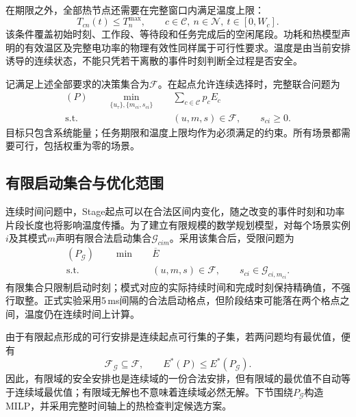 在期限之外，全部热节点还需要在完整窗口内满足温度上限：
\begin{equation}
 T_{cn}(t)\le T_n^{\max},
 \qquad c\in\mathcal C,\ n\in\mathcal N,\ t\in[0,W_c].
 \label{eq:c3-continuous-safe}
\end{equation}
该条件覆盖初始时刻、工作段、等待段和任务完成后的空闲尾段。功耗和热模型声明的有效温区及完整电功率的物理有效性同样属于可行性要求。温度是由当前安排诱导的连续状态，不能只凭若干离散的事件时刻判断全过程是否安全。

记满足上述全部要求的决策集合为$\mathcal F$。在起点允许连续选择时，完整联合问题为
\begin{equation}
 \begin{aligned}
 (P)\qquad
 \min_{\{u_\tau\},\{m_{ci},s_{ci}\}}\quad&
       \sum_{c\in\mathcal C}p_cE_c\\
 \mathrm{s.t.}\qquad&
       (u,m,s)\in\mathcal F,\qquad s_{ci}\ge0.
 \end{aligned}
 \label{eq:c3-continuous-P}
\end{equation}
目标只包含系统能量；任务期限和温度上限均作为必须满足的约束。所有场景都需要可行，包括权重为零的场景。

\subsection{有限启动集合与优化范围}

连续时间问题中，Stage起点可以在合法区间内变化，随之改变的事件时刻和功率片段长度也将影响温度传播。为了建立有限规模的数学规划模型，对每个场景实例$i$及其模式$m$声明有限合法启动集合$\mathcal G_{cim}$。采用该集合后，受限问题为
\begin{equation}
 \begin{aligned}
 (P_{\mathcal G})\qquad
 \min\quad&\overline E\\
 \mathrm{s.t.}\quad&
   (u,m,s)\in\mathcal F,\qquad
   s_{ci}\in\mathcal G_{ci,m_{ci}}.
 \end{aligned}
 \label{eq:c3-finite-P}
\end{equation}
有限集合只限制启动时刻；模式对应的实际持续时间和完成时刻保持精确值，不强行取整。正式实验采用5\,ms间隔的合法启动格点，但阶段结束可能落在两个格点之间，温度仍在连续时间上计算。

由于有限起点形成的可行安排是连续起点可行集的子集，若两问题均有最优值，便有
\begin{equation}
 \mathcal F_{\mathcal G}\subseteq\mathcal F,\qquad
 E^*(P)\le E^*(P_{\mathcal G}).
 \label{eq:c3-restricted-bound}
\end{equation}
因此，有限域的安全安排也是连续域的一份合法安排，但有限域的最优值不自动等于连续域最优值；有限域无解也不意味着连续域必然无解。下节围绕$P_{\mathcal G}$构造MILP，并采用完整时间轴上的热检查判定候选方案。


